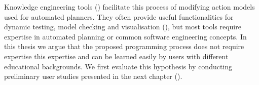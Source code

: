 Knowledge engineering tools () facilitate this process of modifying action models used for automated planners.
They often provide useful functionalities for dynamic testing, model checking and visualisation (\cite{simpson2007planning}), but most tools require expertise in automated planning or common software engineering concepts.
In this thesis we argue that the proposed programming process does not require expertise this expertise and can be learned easily by users with different educational backgrounds.
We first evaluate this hypothesis by conducting preliminary user studies presented in the next chapter ().